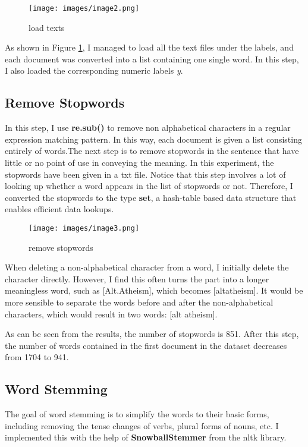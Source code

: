 \documentclass[12pt]{article}
\begin{document}
\begin{figure}[h]  %
    \centering     %
    \texttt{[image: images/image2.png]}  %
    \caption{load texts}  %
    \label{fig:image1.2}  %
\end{figure}

As shown in Figure \ref{fig:image1.2}, I managed to load all the text files under the labels, and each document was converted into a list containing one single word. In this step, I also loaded the corresponding numeric labels \textit{y}. 


\subsection{Remove Stopwords}
In this step, I use \textbf{re.sub()} to remove non alphabetical characters in a regular expression matching pattern. In this way, each document is given a list consisting entirely of words.The next step is to remove stopwords in the sentence that have little or no point of use in conveying the meaning. In this experiment, the stopwords have been given in a txt file. Notice that this step involves a lot of looking up whether a word appears in the list of stopwords or not. Therefore, I converted the stopwords to the type \textbf{set}, a hash-table based data structure that enables efficient data lookups.

\begin{figure}[h]  %
    \centering     %
    \texttt{[image: images/image3.png]}  %
    \caption{remove stopwords}  %
    \label{fig:image1.3}  %
\end{figure}

When deleting a non-alphabetical character from a word, I initially delete the character directly. However, I find this often turns the part into a longer meaningless word, such as [Alt.Atheism], which becomes [altatheism]. It would be more sensible to separate the words before and after the non-alphabetical characters, which would result in two words: [alt atheism].

As can be seen from the results, the number of stopwords is 851. After this step, the number of words contained in the first document in the dataset decreases from 1704 to 941. 

\subsection{Word Stemming}
The goal of word stemming is to simplify the words to their basic forms, including removing the tense changes of verbs, plural forms of nouns, etc. I implemented this with the help of \textbf{SnowballStemmer} from the nltk library\cite{nltk}.
\end{document}
